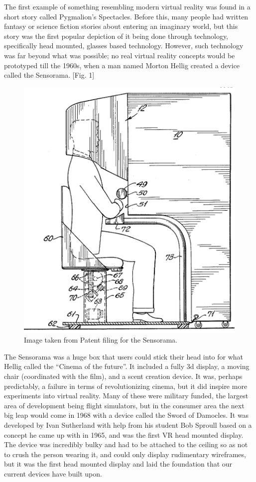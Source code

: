 \documentclass[a4paper,10pt]{article}
\begin{document}
	The first example of something resembling modern virtual reality was found in a short story called Pygmalion's Spectacles.  Before this, many people had written fantasy or science fiction stories about entering an imaginary world, but this story was the first popular depiction of it being done through technology, specifically head mounted, glasses based technology.  However, such technology was far beyond what was possible; no real virtual reality concepts would be prototyped till the 1960s, when a man named Morton Hellig created a device called the Sensorama. [Fig. 1]  
	\begin{figure}[H]
		\centerline{\includegraphics[scale=0.4]{senso.png}}
		\caption{Image taken from Patent filing for the Sensorama.}
		\label{fig:sensorama}
	\end{figure}
	The Sensorama  was a huge box that users could stick their head into for what Hellig called the “Cinema of the future”.  It included a fully 3d display, a moving chair (coordinated with the film), and a scent creation device.  It was, perhaps predictably, a failure in terms of revolutionizing cinema, but it did inspire more experiments into virtual reality.  Many of these were military funded, the largest area of development being flight simulators, but in the consumer area the next big leap would come in 1968 with a device called the Sword of Damocles.\cite{swordDam}  It was developed by Ivan Sutherland with help from his student Bob Sproull based on a concept he came up with in 1965, and was the first VR head mounted display.  The device was incredibly bulky and had to be attached to the ceiling so as not to crush the person wearing it, and could only display rudimentary wireframes, but it was the first head mounted display and laid the foundation that our current devices have built upon.  
\end{document}
